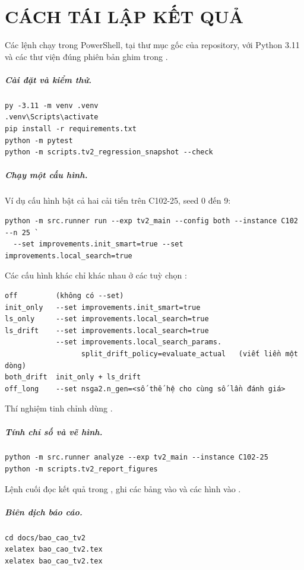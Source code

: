 \chapter{CÁCH TÁI LẬP KẾT QUẢ}

Các lệnh chạy trong PowerShell, tại thư mục gốc của repository, với Python 3.11 và các thư viện đúng
phiên bản ghim trong .

\paragraph{Cài đặt và kiểm thử.}
\begin{Verbatim}
py -3.11 -m venv .venv
.venv\Scripts\activate
pip install -r requirements.txt
python -m pytest
python -m scripts.tv2_regression_snapshot --check
\end{Verbatim}

\paragraph{Chạy một cấu hình.} Ví dụ cấu hình bật cả hai cải tiến trên C102-25, seed 0 đến 9:
\begin{Verbatim}
python -m src.runner run --exp tv2_main --config both --instance C102 --n 25 `
  --set improvements.init_smart=true --set improvements.local_search=true
\end{Verbatim}
Các cấu hình khác chỉ khác nhau ở các tuỳ chọn :
\begin{Verbatim}
off         (không có --set)
init_only   --set improvements.init_smart=true
ls_only     --set improvements.local_search=true
ls_drift    --set improvements.local_search=true
            --set improvements.local_search_params.
                  split_drift_policy=evaluate_actual   (viết liền một dòng)
both_drift  init_only + ls_drift
off_long    --set nsga2.n_gen=<số thế hệ cho cùng số lần đánh giá>
\end{Verbatim}
Thí nghiệm tinh chỉnh dùng .

\paragraph{Tính chỉ số và vẽ hình.}
\begin{Verbatim}
python -m src.runner analyze --exp tv2_main --instance C102-25
python -m scripts.tv2_report_figures
\end{Verbatim}
Lệnh cuối đọc kết quả trong , ghi các bảng vào  và các
hình vào .

\paragraph{Biên dịch báo cáo.}
\begin{Verbatim}
cd docs/bao_cao_tv2
xelatex bao_cao_tv2.tex
xelatex bao_cao_tv2.tex
\end{Verbatim}
